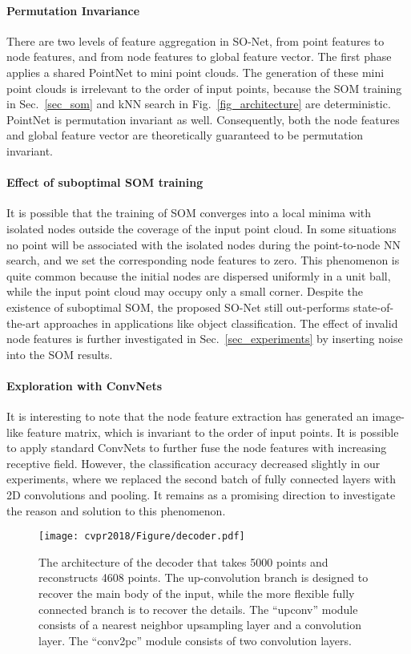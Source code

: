 \documentclass[10pt,twocolumn,letterpaper]{article}
\begin{document}
\paragraph{Permutation Invariance}
There are two levels of feature aggregation in SO-Net, from point features to node features, and from node features to global feature vector. The first phase applies a shared PointNet to  mini point clouds. The generation of these  mini point clouds is irrelevant to the order of input points, because the SOM training in Sec.~\ref{sec_som} and kNN search in Fig.~\ref{fig_architecture} are deterministic. PointNet \cite{qi2016pointnet} is permutation invariant as well. Consequently, both the node features and global feature vector are theoretically guaranteed to be permutation invariant.

\paragraph{Effect of suboptimal SOM training}
It is possible that the training of SOM converges into a local minima with isolated nodes outside the coverage of the input point cloud. In some situations no point will be associated with the isolated nodes during the point-to-node NN search, and we set the corresponding node features to zero. This phenomenon is quite common because the initial nodes are dispersed uniformly in a unit ball, while the input point cloud may occupy only a small corner. Despite the existence of suboptimal SOM, the proposed SO-Net still out-performs state-of-the-art approaches in applications like object classification. The effect of invalid node features is further investigated in Sec.~\ref{sec_experiments} by inserting noise into the SOM results.

\paragraph{Exploration with ConvNets}
It is interesting to note that the node feature extraction has generated an image-like feature matrix, which is invariant to the order of input points. It is possible to apply standard ConvNets to further fuse the node features with increasing receptive field. However, the classification accuracy decreased slightly in our experiments, where we replaced the second batch of fully connected layers with 2D convolutions and pooling. It remains as a promising direction to investigate the reason and solution to this phenomenon.

\begin{figure*}[t] \centering
\texttt{[image: cvpr2018/Figure/decoder.pdf]}
\caption{The architecture of the decoder that takes 5000 points and reconstructs 4608 points. The up-convolution branch is designed to recover the main body of the input, while the more flexible fully connected branch is to recover the details. The ``upconv'' module consists of a nearest neighbor upsampling layer and a  convolution layer. The ``conv2pc'' module consists of two  convolution layers.}\label{fig_decoder}
\vspace{-4pt}
\end{figure*}
\end{document}
